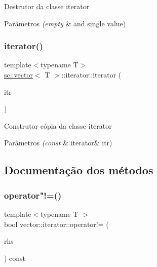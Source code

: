 Destrutor da classe iterator 
\begin{DoxyParams}{Parâmetros}
{\em (empty} & and single value) \\
\hline
\end{DoxyParams}
\mbox{\label{classsc_1_1vector_1_1iterator_af4c2845a66919933ab809508a7acf3a6}} 
\subsubsection{\texorpdfstring{iterator()}{iterator()}\hspace{0.1cm}{\footnotesize\ttfamily [2/2]}}
{\footnotesize\ttfamily template$<$typename T$>$ \\
\mbox{\hyperlink{classsc_1_1vector}{sc\+::vector}}$<$ T $>$\+::iterator\+::iterator (\begin{DoxyParamCaption}\item[{const \mbox{\hyperlink{classsc_1_1vector_1_1iterator}{iterator}} \&}]{itr }\end{DoxyParamCaption})}

Construtor cópia da classe iterator 
\begin{DoxyParams}{Parâmetros}
{\em (const} & iterator\& itr) \\
\hline
\end{DoxyParams}


\subsection{Documentação dos métodos}
\mbox{\label{classsc_1_1vector_1_1iterator_a4369c4ee1b1d5f03f6e524eef07b905c}} 
\subsubsection{\texorpdfstring{operator"!=()}{operator!=()}}
{\footnotesize\ttfamily template$<$typename T $>$ \\
bool vector\+::iterator\+::operator!= (\begin{DoxyParamCaption}\item[{const \mbox{\hyperlink{classsc_1_1vector_1_1iterator}{iterator}} \&}]{rhs }\end{DoxyParamCaption}) const}

